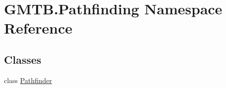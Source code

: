 \hypertarget{namespace_g_m_t_b_1_1_pathfinding}{}\section{G\+M\+T\+B.\+Pathfinding Namespace Reference}
\label{namespace_g_m_t_b_1_1_pathfinding}
\subsection*{Classes}
\begin{DoxyCompactItemize}
\item 
class \mbox{\hyperlink{class_g_m_t_b_1_1_pathfinding_1_1_pathfinder}{Pathfinder}}
\end{DoxyCompactItemize}
